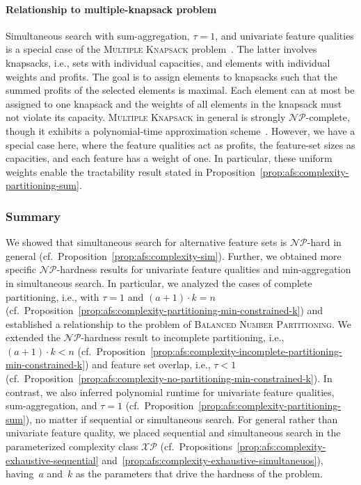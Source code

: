 \documentclass{article}
\theoremstyle{definition}
\begin{document}
\paragraph{Relationship to multiple-knapsack problem}

Simultaneous search with sum-aggregation, $\tau=1$, and univariate feature qualities is a special case of the \textsc{Multiple Knapsack} problem~\cite{chekuri2005polynomial}.
The latter involves knapsacks, i.e., sets with individual capacities, and elements with individual weights and profits.
The goal is to assign elements to knapsacks such that the summed profits of the selected elements is maximal.
Each element can at most be assigned to one knapsack and the weights of all elements in the knapsack must not violate its capacity.
\textsc{Multiple Knapsack} in general is strongly $\mathcal{NP}$-complete, though it exhibits a polynomial-time approximation scheme~\cite{chekuri2005polynomial}.
However, we have a special case here, where the feature qualities act as profits, the feature-set sizes as capacities, and each feature has a weight of one.
In particular, these uniform weights enable the tractability result stated in Proposition~\ref{prop:afs:complexity-partitioning-sum}.

\subsubsection{Summary}
\label{sec:afs:appendix:complexity:summary}

We showed that simultaneous search for alternative feature sets is $\mathcal{NP}$-hard in general (cf.~Proposition~\ref{prop:afs:complexity-sim}).
Further, we obtained more specific $\mathcal{NP}$-hardness results for univariate feature qualities and min-aggregation in simultaneous search.
In particular, we analyzed the cases of complete partitioning, i.e., with $\tau = 1$ and $(a+1) \cdot k = n$ (cf.~Proposition~\ref{prop:afs:complexity-partitioning-min-constrained-k}) and established a relationship to the problem of \textsc{Balanced Number Partitioning}.
We extended the $\mathcal{NP}$-hardness result to incomplete partitioning, i.e., $(a+1) \cdot k < n$ (cf.~Proposition~\ref{prop:afs:complexity-incomplete-partitioning-min-constrained-k}) and feature set overlap, i.e., $\tau < 1$ (cf.~Proposition~\ref{prop:afs:complexity-no-partitioning-min-constrained-k}).
In contrast, we also inferred polynomial runtime for univariate feature qualities, sum-aggregation, and $\tau = 1$ (cf.~Proposition~\ref{prop:afs:complexity-partitioning-sum}), no matter if sequential or simultaneous search.
For general rather than univariate feature quality, we placed sequential and simultaneous search in the parameterized complexity class $\mathcal{XP}$ (cf.~Propositions~\ref{prop:afs:complexity-exhaustive-sequential} and~\ref{prop:afs:complexity-exhaustive-simultaneuos}), having~$a$ and~$k$ as the parameters that drive the hardness of the problem.
\end{document}
